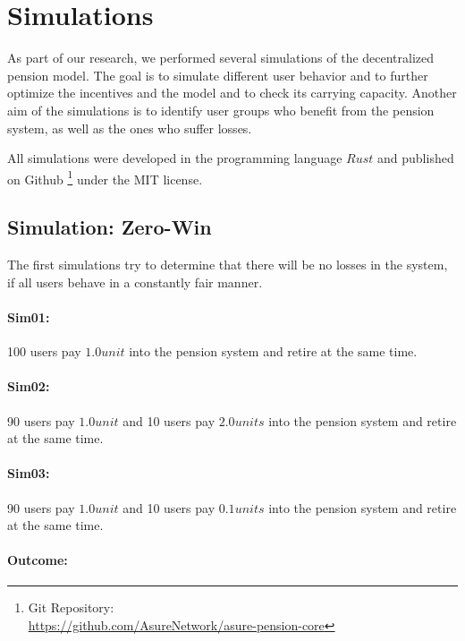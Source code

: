 \section{Simulations}

As part of our research, we performed several simulations of the decentralized pension model. The goal is to simulate different user behavior and to further optimize the incentives and the model and to check its carrying capacity. Another aim of the simulations is to identify user groups who benefit from the pension system, as well as the ones who suffer losses.

All simulations were developed in the programming language $Rust$ and published on Github \footnote{ Git Repository:\\
\url{https://github.com/AsureNetwork/asure-pension-core}} under the MIT license.\\


\subsection{Simulation: Zero-Win}

The first simulations try to determine that there will be no losses in the system, if all users behave in a constantly fair manner.

\paragraph{Sim01:} 100 users pay $1.0 unit$ into the pension system and retire at the same time.

\paragraph{Sim02:} 90 users pay $1.0 unit$ and 10 users pay $2.0 units$ into the pension system and retire at the same time.

\paragraph{Sim03:} 90 users pay $1.0 unit$ and 10 users pay $0.1 units$ into the pension system and retire at the same time.

\paragraph{Outcome:}

\begin{table}[hbt!]
\centering
{}
\end{table}

